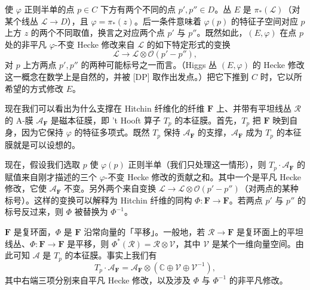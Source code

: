 \documentclass[11pt,a4paper]{article}
\begin{document}
使 $\varphi$ 正则半单的点 $p\in C$ 下方有两个不同的点 $p',p''\in D$。丛 $E$ 是 $\pi_*(\mathcal{L})$（对某个线丛 $\mathcal{L}\to D$），且 $\varphi=\pi_*(z)$。后一条件意味着 $\varphi(p)$ 的特征子空间对应 $p$ 上方 $z$ 的两个不同取值，换言之对应两个点 $p'$ 与 $p''$。既然如此，$(E,\varphi)$ 在点 $p$ 处的非平凡 $\varphi$-不变 Hecke 修改来自 $\mathcal{L}$ 的如下特定形式的变换
\begin{equation}\tag{5.27}
\mathcal{L}\to\mathcal{L}\otimes\mathcal{O}(p'-p''),
\end{equation}
对 $p$ 上方两点 $p',p''$ 的两种可能标号之一而言。（Higgs 丛 $(E,\varphi)$ 的 Hecke 修改这一概念在数学上是自然的，并被 [DP] 取作出发点。）把它下推到 $C$ 时，它以所希望的方式修改 $E$。


现在我们可以看出为什么支撑在 Hitchin 纤维化的纤维 $\boldsymbol{F}$ 上、并带有平坦线丛 $\mathcal{R}$ 的 A-膜 $\mathcal{A}_{\boldsymbol{F}}$ 是磁本征膜，即 't Hooft 算子 $T_p$ 的本征膜。首先，$T_p$ 把 $\boldsymbol{F}$ 映到自身，因为它保持 $\varphi$ 的特征多项式。既然 $T_p$ 保持 $\mathcal{A}_{\boldsymbol{F}}$ 的支撑，$\mathcal{A}_{\boldsymbol{F}}$ 成为 $T_p$ 的本征膜就是可以设想的。

现在，假设我们选取 $p$ 使 $\varphi(p)$ 正则半单（我们只处理这一情形），则 $T_p\cdot\mathcal{A}_{\boldsymbol{F}}$ 的赋值来自刚才描述的三个 $\varphi$-不变 Hecke 修改的贡献之和。其中一个是平凡 Hecke 修改，它使 $\mathcal{A}_{\boldsymbol{F}}$ 不变。另外两个来自变换 $\mathcal{L}\to\mathcal{L}\otimes\mathcal{O}(p'-p'')$（对两点的某种标号）。这样的变换可以解释为 Hitchin 纤维的同构 $\Phi:\boldsymbol{F}\to\boldsymbol{F}$。若两点 $p'$ 与 $p''$ 的标号反过来，则 $\Phi$ 被替换为 $\Phi^{-1}$。

$\boldsymbol{F}$ 是复环面，$\Phi$ 是 $\boldsymbol{F}$ 沿常向量的「平移」。一般地，若 $\mathcal{R}\to\boldsymbol{F}$ 是复环面上的平坦线丛、$\Phi:\boldsymbol{F}\to\boldsymbol{F}$ 是平移，则 $\Phi^*(\mathcal{R})=\mathcal{R}\otimes\mathcal{V}$，其中 $\mathcal{V}$ 是某个一维向量空间。由此可知 $\mathcal{A}$ 是 $T_p$ 的本征膜。事实上我们有
\begin{equation}\tag{5.28}
T_p\cdot\mathcal{A}_{\boldsymbol{F}}=\mathcal{A}_{\boldsymbol{F}}\otimes(\mathbb{C}\oplus\mathcal{V}\oplus\mathcal{V}^{-1}),
\end{equation}
其中右端三项分别来自平凡 Hecke 修改，以及涉及 $\Phi$ 与 $\Phi^{-1}$ 的非平凡修改。
\end{document}
